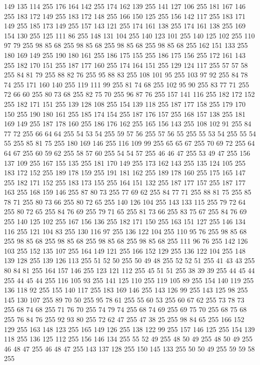 149 135 114 255 176 164 142 255 174 162 139 255 141 127 106 255 181 167 146 255 183 172 149 255 183 172 148 255 166 150 125 255 156 142 117 255 183 171 149 255 185 173 149 255 157 143 121 255 174 161 138 255 174 161 138 255 169 154 130 255 125 111 86 255 148 131 104 255 140 123 101 255 140 125 102 255 110 97 79 255 98 85 68 255 98 85 68 255 98 85 68 255 98 85 68 255 162 151 133 255 180 169 149 255 190 180 161 255 186 175 155 255 186 175 156 255 172 161 143 255 182 170 151 255 187 177 160 255 174 164 151 255 129 124 117 255 57 57 58 255 84 81 79 255 88 82 76 255 95 88 83 255 108 101 95 255 103 97 92 255 84 78 74 255 171 160 140 255 119 111 99 255 81 74 68 255 102 95 90 255 83 77 71 255 72 66 60 255 80 73 68 255 82 75 70 255 96 87 76 255 157 141 116 255 182 172 152 255 182 171 151 255 139 128 108 255 154 139 118 255 187 177 158 255 179 170 150 255 190 180 161 255 185 174 154 255 187 176 157 255 168 157 138 255 181 169 149 255 187 178 160 255 186 176 162 255
165 156 143 255 108 102 91 255 84 77 72 255 66 64 64 255 54 53 54 255 59 57 56 255 57 56 55 255 55 53 54 255 55 54 55 255 85 81 75 255 180 169 146 255 116 109 99 255 65 65 67 255 70 69 72 255 64 64 67 255 60 59 62 255 58 57 60 255 54 54 57 255 46 46 47 255 53 49 47 255 156 137 109 255 167 155 135 255 181 170 149 255 173 162 143 255 135 124 105 255 183 172 152 255 189 178 159 255 191 181 162 255 189 178 160 255 175 165 147 255 182 171 152 255 183 173 155 255 164 151 132 255 187 177 157 255 187 177 163 255 168 159 146 255 87 80 73 255 77 69 62 255 84 77 71 255 88 81 75 255 85 78 71 255 80 73 66 255 80 72 65 255 140 126 104 255 143 133 115 255 79 72 64 255 80 72 65 255 84 76 69 255 79 71 65 255 81 73 66 255 83 75 67 255 84 76 69 255 140 125 102 255 167 156 136 255 182 171 150 255 163 151 127 255 146 134 116 255 121 104 83 255 130 116 97 255 136 122 104 255 110 95 76 255 98 85 68 255 98 85 68 255 98 85 68 255
98 85 68 255 98 85 68 255 111 96 76 255 142 126 103 255 152 135 107 255 164 149 121 255 166 152 129 255 136 122 104 255 148 139 128 255 139 126 113 255 51 52 50 255 50 49 48 255 52 52 51 255 41 43 43 255 80 84 81 255 164 157 146 255 123 121 112 255 45 51 51 255 38 39 39 255 44 45 44 255 44 45 44 255 116 105 93 255 141 125 110 255 119 105 89 255 154 140 119 255 136 118 92 255 155 140 117 255 183 169 146 255 143 126 99 255 143 125 98 255 145 130 107 255 89 70 50 255 95 78 61 255 55 60 53 255 60 67 62 255 73 78 73 255 68 74 68 255 71 76 70 255 74 79 74 255 68 74 69 255 69 75 70 255 68 75 68 255 76 84 76 255 92 93 80 255 72 62 47 255 47 38 25 255 98 84 65 255 166 152 129 255 163 148 123 255 165 149 126 255 138 122 99 255 157 146 125 255 154 139 118 255 136 125 112 255 156 146 134 255 55 52 49 255 48 50 49 255 48 50 49 255 46 48 47 255 46 48 47 255 143 137 128 255 150 145 133 255 50 50 49 255 59 59 58 255
